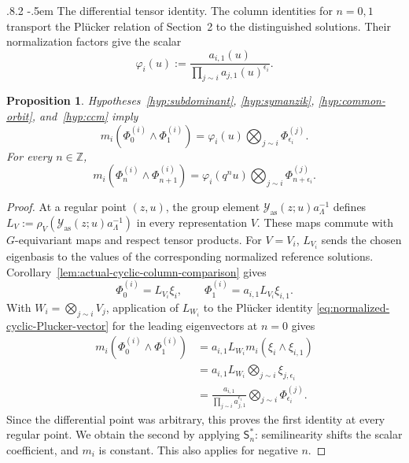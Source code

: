 \documentclass[11pt,leqno]{amsart}
\makeatletter
\numberwithin{equation}{section}
\renewcommand\paragraph{\@startsection{paragraph}{4}{\z@}%
  {.8\baselineskip \@plus .2\baselineskip}%
  {-.5em}%
  {\normalfont\normalsize\bfseries}}
\theoremstyle{plain}
\newtheorem{proposition}[theorem]{Proposition}
\theoremstyle{definition}
\theoremstyle{plain}
\theoremstyle{definition}
\theoremstyle{remark}
\makeatother
\begin{document}
\paragraph{The differential tensor identity.}
The column identities for $n=0,1$ transport the Pl\"ucker relation of Section~2 to the distinguished solutions.  Their normalization factors give the scalar
\begin{equation}\label{eq:asymptotic-tensor-multiplier}
 \varphi_i(u):=\frac{a_{i,1}(u)}{\prod_{j\sim i}a_{j,1}(u)^{\epsilon_i}}.
\end{equation}
\begin{proposition}\label{prop:general-Phi-from-Kostant}\label{prop:derived-Phi-system}
Hypotheses~\ref{hyp:subdominant}, \ref{hyp:symanzik}, \ref{hyp:common-orbit}, and~\ref{hyp:ccm} imply
\begin{equation}\label{eq:hyp-fundamental-Phi-system}
 m_i(\Phi_0^{(i)}\wedge\Phi_1^{(i)})
 =\varphi_i(u)\bigotimes_{j\sim i}\Phi_{\epsilon_i}^{(j)}.
\end{equation}
For every $n\in\mathbb Z$,
\begin{equation}\label{eq:hyp-integral-Phi-system}
 m_i(\Phi_n^{(i)}\wedge\Phi_{n+1}^{(i)})
 =\varphi_i(q^nu)\bigotimes_{j\sim i}\Phi_{n+\epsilon_i}^{(j)}.
\end{equation}
\end{proposition}
\begin{proof}
At a regular point $(z,u)$, the group element $\mathcal Y_{\mathrm{as}}(z;u)a_\Lambda^{-1}$ defines $L_V:=\rho_V(\mathcal Y_{\mathrm{as}}(z;u)a_\Lambda^{-1})$ in every representation $V$.  These maps commute with $G$-equivariant maps and respect tensor products.  For $V=V_i$, $L_{V_i}$ sends the chosen eigenbasis to the values of the corresponding normalized reference solutions.  Corollary~\ref{lem:actual-cyclic-column-comparison} gives
\[
 \Phi_0^{(i)}=L_{V_i}\xi_i,\qquad
 \Phi_1^{(i)}=a_{i,1}L_{V_i}\xi_{i,1}.
\]
With $W_i=\bigotimes_{j\sim i}V_j$, application of $L_{W_i}$ to the Pl\"ucker identity \eqref{eq:normalized-cyclic-Plucker-vector} for the leading eigenvectors at $n=0$ gives
\begin{align*}
 m_i(\Phi_0^{(i)}\wedge\Phi_1^{(i)})
 &=a_{i,1}L_{W_i}m_i(\xi_i\wedge\xi_{i,1})\\
 &=a_{i,1}L_{W_i}\bigotimes_{j\sim i}\xi_{j,\epsilon_i}\\
 &=\frac{a_{i,1}}{\prod_{j\sim i}a_{j,1}^{\epsilon_i}}
      \bigotimes_{j\sim i}\Phi_{\epsilon_i}^{(j)}.
\end{align*}
Since the differential point was arbitrary, this proves the first identity at every regular point.  We obtain the second by applying $\mathsf S_n^*$: semilinearity shifts the scalar coefficient, and $m_i$ is constant.  This also applies for negative $n$.
\end{proof}
\end{document}
